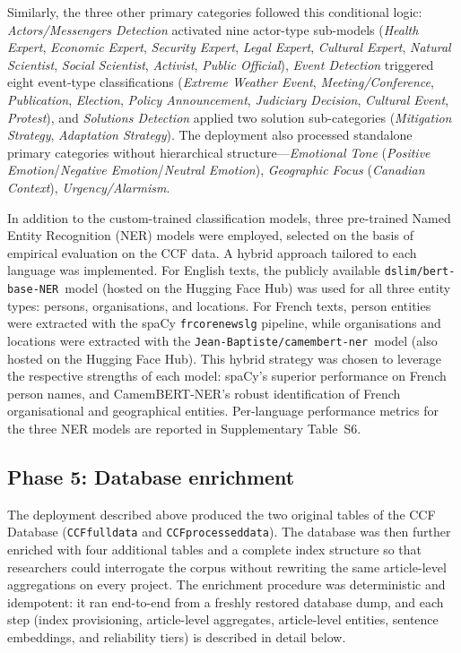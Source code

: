 \documentclass[12pt]{article}
\renewcommand\_{\texttt{\detokenize{_}\allowbreak}}
\begin{document}
Similarly, the three other primary categories followed this conditional logic: \emph{Actors/Messengers Detection} activated nine actor-type sub-models (\emph{Health Expert}, \emph{Economic Expert}, \emph{Security Expert}, \emph{Legal Expert}, \emph{Cultural Expert}, \emph{Natural Scientist}, \emph{Social Scientist}, \emph{Activist}, \emph{Public Official}), \emph{Event Detection} triggered eight event-type classifications (\emph{Extreme Weather Event}, \emph{Meeting/Conference}, \emph{Publication}, \emph{Election}, \emph{Policy Announcement}, \emph{Judiciary Decision}, \emph{Cultural Event}, \emph{Protest}), and \emph{Solutions Detection} applied two solution sub-categories (\emph{Mitigation Strategy}, \emph{Adaptation Strategy}). The deployment also processed standalone primary categories without hierarchical structure---\emph{Emotional Tone} (\emph{Positive Emotion}/\emph{Negative Emotion}/\emph{Neutral Emotion}), \emph{Geographic Focus} (\emph{Canadian Context}), \emph{Urgency/Alarmism}.

In addition to the custom-trained classification models, three pre-trained Named Entity Recognition (NER) models were employed, selected on the basis of empirical evaluation on the CCF data. A hybrid approach tailored to each language was implemented. For English texts, the publicly available \texttt{dslim/bert-base-NER}\ model (hosted on the Hugging Face Hub) was used for all three entity types: persons, organisations, and locations. For French texts, person entities were extracted with the spaCy \texttt{fr\_core\_news\_lg} pipeline, while organisations and locations were extracted with the \texttt{Jean-Baptiste/camembert-ner}\ model (also hosted on the Hugging Face Hub). This hybrid strategy was chosen to leverage the respective strengths of each model: spaCy's superior performance on French person names, and CamemBERT-NER's robust identification of French organisational and geographical entities. Per-language performance metrics for the three NER models are reported in Supplementary Table~S6.

\subsection{Phase 5: Database enrichment}
\label{subsec:database_enrichment}

The deployment described above produced the two original tables of the CCF Database (\texttt{CCF\_full\_data} and \texttt{CCF\_processed\_data}). The database was then further enriched with four additional tables and a complete index structure so that researchers could interrogate the corpus without rewriting the same article-level aggregations on every project. The enrichment procedure was deterministic and idempotent: it ran end-to-end from a freshly restored database dump, and each step (index provisioning, article-level aggregates, article-level entities, sentence embeddings, and reliability tiers) is described in detail below.
\end{document}
